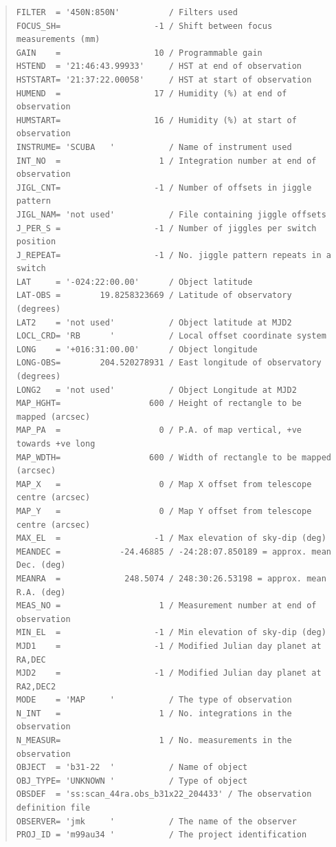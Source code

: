 \documentclass[twoside,11pt]{article}
\newenvironment{myquote}{\begin{quote}\begin{small}}{\end{small}\end{quote}}
\renewcommand{\_}{\texttt{\symbol{95}}}
\begin{document}
\begin{myquote}
\begin{verbatim}
FILTER  = '450N:850N'          / Filters used
FOCUS_SH=                   -1 / Shift between focus measurements (mm)
GAIN    =                   10 / Programmable gain
HSTEND  = '21:46:43.99933'     / HST at end of observation
HSTSTART= '21:37:22.00058'     / HST at start of observation
HUMEND  =                   17 / Humidity (%) at end of observation
HUMSTART=                   16 / Humidity (%) at start of observation
INSTRUME= 'SCUBA   '           / Name of instrument used
INT_NO  =                    1 / Integration number at end of observation
JIGL_CNT=                   -1 / Number of offsets in jiggle pattern
JIGL_NAM= 'not used'           / File containing jiggle offsets
J_PER_S =                   -1 / Number of jiggles per switch position
J_REPEAT=                   -1 / No. jiggle pattern repeats in a switch
LAT     = '-024:22:00.00'      / Object latitude
LAT-OBS =        19.8258323669 / Latitude of observatory (degrees)
LAT2    = 'not used'           / Object latitude at MJD2
LOCL_CRD= 'RB      '           / Local offset coordinate system
LONG    = '+016:31:00.00'      / Object longitude
LONG-OBS=        204.520278931 / East longitude of observatory (degrees)
LONG2   = 'not used'           / Object Longitude at MJD2
MAP_HGHT=                  600 / Height of rectangle to be mapped (arcsec)
MAP_PA  =                    0 / P.A. of map vertical, +ve towards +ve long
MAP_WDTH=                  600 / Width of rectangle to be mapped (arcsec)
MAP_X   =                    0 / Map X offset from telescope centre (arcsec)
MAP_Y   =                    0 / Map Y offset from telescope centre (arcsec)
MAX_EL  =                   -1 / Max elevation of sky-dip (deg)
MEANDEC =            -24.46885 / -24:28:07.850189 = approx. mean Dec. (deg)
MEANRA  =             248.5074 / 248:30:26.53198 = approx. mean R.A. (deg)
MEAS_NO =                    1 / Measurement number at end of observation
MIN_EL  =                   -1 / Min elevation of sky-dip (deg)
MJD1    =                   -1 / Modified Julian day planet at RA,DEC
MJD2    =                   -1 / Modified Julian day planet at RA2,DEC2
MODE    = 'MAP     '           / The type of observation
N_INT   =                    1 / No. integrations in the observation
N_MEASUR=                    1 / No. measurements in the observation
OBJECT  = 'b31-22  '           / Name of object
OBJ_TYPE= 'UNKNOWN '           / Type of object
OBSDEF  = 'ss:scan_44ra.obs_b31x22_204433' / The observation definition file
OBSERVER= 'jmk     '           / The name of the observer
PROJ_ID = 'm99au34 '           / The project identification

\end{verbatim}
\end{myquote}
\end{document}
